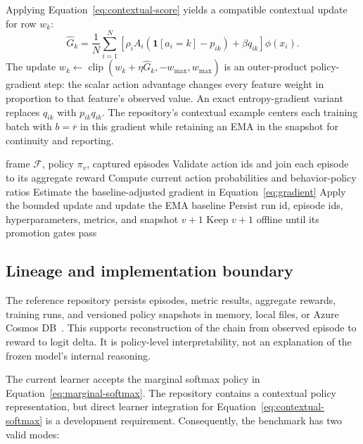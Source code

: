 \documentclass[conference]{IEEEtran}
\begin{document}
Applying Equation~\ref{eq:contextual-score} yields a compatible
contextual update for row $w_k$:
\begin{equation}
\widehat{G}_k=\frac{1}{N}\sum_{i=1}^{N}
\left[\rho_iA_i(\mathbf{1}[a_i=k]-p_{ik})
+\beta q_{ik}\right]\phi(x_i).
\label{eq:contextual-update}
\end{equation}
The update $w_k\leftarrow\operatorname{clip}
(w_k+\eta\widehat{G}_k,-w_{\max},w_{\max})$ is an outer-product
policy-gradient step: the scalar action advantage changes every
feature weight in proportion to that feature's observed value. An
exact entropy-gradient variant replaces $q_{ik}$ with $p_{ik}q_{ik}$.
The repository's contextual example centers each training batch with
$b=\overline{r}$ in this gradient while retaining an EMA in the
snapshot for continuity and reporting.

\begin{algorithm}[t]
\caption{Bounded offline policy update}
\label{alg:update}
\begin{algorithmic}[1]
\REQUIRE frame $\mathcal{F}$, policy $\pi_v$, captured episodes
\STATE Validate action ids and join each episode to its aggregate reward
\STATE Compute current action probabilities and behavior-policy ratios
\STATE Estimate the baseline-adjusted gradient in Equation~\ref{eq:gradient}
\STATE Apply the bounded update and update the EMA baseline
\STATE Persist run id, episode ids, hyperparameters, metrics, and snapshot $v+1$
\STATE Keep $v+1$ offline until its promotion gates pass
\end{algorithmic}
\end{algorithm}

\subsection{Lineage and implementation boundary}

The reference repository persists episodes, metric results, aggregate
rewards, training runs, and versioned policy snapshots in memory,
local files, or Azure Cosmos DB~\cite{agentlearningsdk2026}. This
supports reconstruction of the chain from observed episode to reward
to logit delta. It is policy-level interpretability, not an
explanation of the frozen model's internal reasoning.

The current learner accepts the marginal softmax policy in
Equation~\ref{eq:marginal-softmax}. The repository contains a
contextual policy representation, but direct learner integration for
Equation~\ref{eq:contextual-softmax} is a development requirement.
Consequently, the benchmark has two valid modes:
\end{document}

